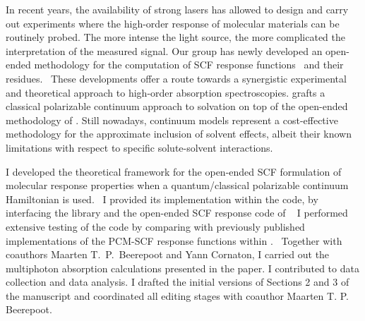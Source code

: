 In recent years, the availability of strong lasers has allowed to
design and carry out experiments where the high-order response of
molecular materials can be routinely probed.
The more intense the light source, the more complicated the interpretation of
the measured signal.
Our group has newly developed an open-ended methodology for the computation of
\acrshort{SCF} response functions~\autocite{Thorvaldsen2008-sg, Ringholm2014-gx} and
their residues.~\autocite{Friese2015-kb}
These developments offer a route towards a synergistic experimental and
theoretical approach to high-order absorption spectroscopies.
 grafts a classical polarizable continuum approach to solvation on top
of the open-ended methodology of \citeauthor{Thorvaldsen2008-sg}.
Still nowadays, continuum models represent a cost-effective methodology for the
approximate inclusion of solvent effects, albeit their known limitations with respect
to specific solute-solvent interactions.

I developed the theoretical framework for the open-ended \acrshort{SCF} formulation
of molecular response properties when a quantum/classical polarizable continuum
Hamiltonian is used.~\autocite{Thorvaldsen2008-sg, Lipparini2010-be}
I provided its implementation within the \DALTON code, by interfacing the
\pcmsolver library and the open-ended \acrshort{SCF} response code of
\citeauthor{Ringholm2014-gx}~\autocite{Ringholm2014-gx, Friese2015-kb}
I performed extensive testing of the code by comparing with previously
published implementations of the \acrshort{PCM}-\acrshort{SCF} response functions within
\DALTON.~\autocite{Cammi2003-qy, Frediani2005-nc, Ferrighi2010-pm}
Together with coauthors Maarten T.~P.~Beerepoot and Yann Cornaton, I carried out
the multiphoton absorption calculations presented in the paper. I contributed
to data collection and data analysis.
I drafted the initial versions of Sections 2 and 3 of the manuscript and coordinated all
editing stages with coauthor Maarten T. P. Beerepoot.

